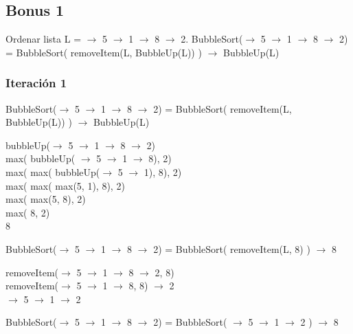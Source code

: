 \documentclass[11pt]{utalcaDoc}
\numberwithin{equation}{section}
\begin{document}
\subsection{Bonus 1}
Ordenar lista L = $\to$ 5 $\to$ 1 $\to$ 8 $\to$ 2.
\newline
\newline
BubbleSort($\to$ 5 $\to$ 1 $\to$ 8 $\to$ 2) = BubbleSort( removeItem(L, BubbleUp(L)) ) $\to$ BubbleUp(L)
\subsubsection{Iteración 1}
 BubbleSort($\to$ 5 $\to$ 1 $\to$ 8 $\to$ 2) = BubbleSort( removeItem(L, BubbleUp(L)) ) $\to$ BubbleUp(L)
 \begin{center}
    bubbleUp($\to$ 5 $\to$ 1 $\to$ 8 $\to$ 2)\\
    max( bubbleUp( $\to$ 5 $\to$ 1 $\to$ 8), 2)\\
    max( max( bubbleUp($\to$ 5 $\to$ 1), 8), 2)\\
    max( max( max(5, 1), 8), 2)\\
    max( max(5, 8), 2)\\
    max( 8, 2)\\
    8\\
 \end{center}
 BubbleSort($\to$ 5 $\to$ 1 $\to$ 8 $\to$ 2) = BubbleSort( removeItem(L, 8) ) $\to$ 8
 \begin{center}
    removeItem($\to$ 5 $\to$ 1 $\to$ 8 $\to$ 2, 8)\\
    removeItem($\to$ 5 $\to$ 1 $\to$ 8, 8) $\to$ 2\\
    $\to$ 5 $\to$ 1 $\to$ 2\\
 \end{center}
 BubbleSort($\to$ 5 $\to$ 1 $\to$ 8 $\to$ 2) = BubbleSort( $\to$ 5 $\to$ 1 $\to$ 2 ) $\to$ 8
\end{document}

